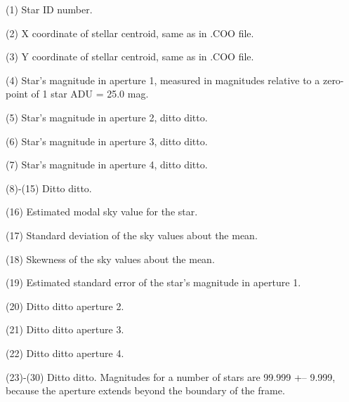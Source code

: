 \item{(1)} Star ID number.
\item{(2)} X coordinate of stellar centroid, same as in .COO file.
\item{(3)} Y coordinate of stellar centroid, same as in .COO file.
\item{(4)} Star's magnitude in aperture 1, measured in magnitudes relative to
a zero-point of 1 star ADU = 25.0 mag.
\item{(5)} Star's magnitude in aperture 2, ditto ditto.
\item{(6)} Star's magnitude in aperture 3, ditto ditto.
\item{(7)} Star's magnitude in aperture 4, ditto ditto.
\item{(8)-(15)} Ditto ditto.
\item{(16)} Estimated modal sky value for the star.
\item{(17)} Standard deviation of the sky values about the mean.
\item{(18)} Skewness of the sky values about the mean.
\item{(19)} Estimated standard error of the star's magnitude in aperture 1.
\item{(20)} Ditto ditto aperture 2.
\item{(21)} Ditto ditto aperture 3.
\item{(22)} Ditto ditto aperture 4.
\item{(23)-(30)} Ditto ditto.
\medskip
Magnitudes for a number of stars are 99.999 +-- 9.999, because the
aperture extends beyond the boundary of the frame.

\vfill
\eject

